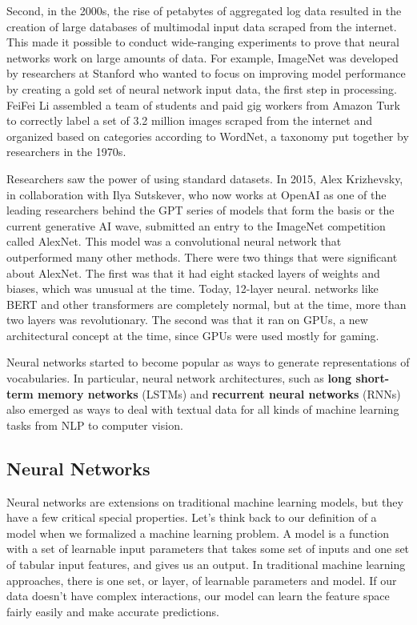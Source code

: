\documentclass[11pt, table]{diazessay} %
\begin{document}
\begin{sloppypar}
Second, in the 2000s, the rise of petabytes of aggregated log data resulted in the creation of large databases of multimodal input data scraped from the internet. This made it possible to conduct wide-ranging experiments to prove that neural networks work on large amounts of data. For example, ImageNet was developed by researchers at Stanford who wanted to focus on improving model performance by creating a gold set of neural network input data, the first step in processing. FeiFei Li assembled a team of students and paid gig workers from Amazon Turk to correctly label a set of 3.2 million images scraped from the internet and organized based on categories according to WordNet, a taxonomy put together by researchers in the 1970s\citep{russakovsky2015imagenet}.

Researchers saw the power of using standard datasets. In 2015, Alex Krizhevsky, in collaboration with Ilya Sutskever, who now works at OpenAI as one of the leading researchers behind the GPT series of models that form the basis or the current generative AI wave, submitted an entry to the ImageNet competition called AlexNet. This model was a convolutional neural network that outperformed many other methods. There were two things that were significant about AlexNet. The first was that it had eight stacked layers of weights and biases, which was unusual at the time. Today, 12-layer neural. networks like BERT and other transformers are completely normal, but at the time, more than two layers was revolutionary. The second was that it ran on GPUs, a new architectural concept at the time, since GPUs were used mostly for gaming.

Neural networks started to become popular as ways to generate representations of vocabularies. In particular, neural network architectures, such as \textbf{long short-term memory networks} (LSTMs) and \textbf{recurrent neural networks} (RNNs) also emerged as ways to deal with textual data for all kinds of machine learning tasks from NLP to computer vision.


\subsection{Neural Networks}

Neural networks are extensions on traditional machine learning models, but they have a few critical special properties. Let's think back to our definition of a model when we formalized a machine learning problem. A model is a function with a set of learnable input parameters that takes some set of inputs and one set of tabular input features, and gives us an output. In traditional machine learning approaches, there is one set, or layer, of learnable parameters and model. If our data doesn't have complex interactions, our model can learn the feature space fairly easily and make accurate predictions.


\end{sloppypar}
\end{document}
